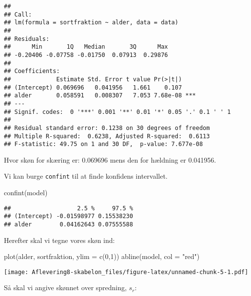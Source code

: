 \documentclass[
]{article}
\newenvironment{Shaded}{\begin{snugshade}}{\end{snugshade}}
\newcommand{\AttributeTok}[1]{\textcolor[rgb]{0.77,0.63,0.00}{#1}}
\newcommand{\DecValTok}[1]{\textcolor[rgb]{0.00,0.00,0.81}{#1}}
\newcommand{\FunctionTok}[1]{\textcolor[rgb]{0.00,0.00,0.00}{#1}}
\newcommand{\NormalTok}[1]{#1}
\newcommand{\SpecialCharTok}[1]{\textcolor[rgb]{0.00,0.00,0.00}{#1}}
\newcommand{\StringTok}[1]{\textcolor[rgb]{0.31,0.60,0.02}{#1}}
\begin{document}
\begin{verbatim}
## 
## Call:
## lm(formula = sortfraktion ~ alder, data = data)
## 
## Residuals:
##      Min       1Q   Median       3Q      Max 
## -0.20406 -0.07758 -0.01750  0.07913  0.29876 
## 
## Coefficients:
##             Estimate Std. Error t value Pr(>|t|)    
## (Intercept) 0.069696   0.041956   1.661    0.107    
## alder       0.058591   0.008307   7.053 7.68e-08 ***
## ---
## Signif. codes:  0 '***' 0.001 '**' 0.01 '*' 0.05 '.' 0.1 ' ' 1
## 
## Residual standard error: 0.1238 on 30 degrees of freedom
## Multiple R-squared:  0.6238, Adjusted R-squared:  0.6113 
## F-statistic: 49.75 on 1 and 30 DF,  p-value: 7.677e-08
\end{verbatim}

Hvor skøn for skæring er: 0.069696 mens den for hældning er 0.041956.

Vi kan burge \texttt{confint} til at finde konfidens intervallet.

\begin{Shaded}
\begin{Highlighting}[]
\FunctionTok{confint}\NormalTok{(model)}
\end{Highlighting}
\end{Shaded}

\begin{verbatim}
##                   2.5 %     97.5 %
## (Intercept) -0.01598977 0.15538230
## alder        0.04162643 0.07555588
\end{verbatim}

Herefter skal vi tegne vores skøn ind:

\begin{Shaded}
\begin{Highlighting}[]
\FunctionTok{plot}\NormalTok{(alder, sortfraktion, }\AttributeTok{ylim =} \FunctionTok{c}\NormalTok{(}\DecValTok{0}\NormalTok{,}\DecValTok{1}\NormalTok{))}
\FunctionTok{abline}\NormalTok{(model, }\AttributeTok{col =} \StringTok{"red"}\NormalTok{)}
\end{Highlighting}
\end{Shaded}

\texttt{[image: Aflevering8-skabelon\_files/figure-latex/unnamed-chunk-5-1.pdf]}

Så skal vi angive skønnet over spredning, \(s_r\):

\begin{Shaded}
\end{Shaded}
\end{document}
